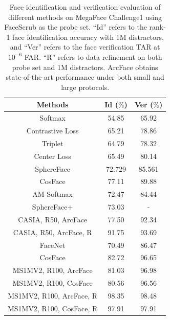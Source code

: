 \documentclass[10pt,twocolumn,letterpaper]{article}
\begin{document}
\begin{table}[t!]
\begin{center}
\begin{tabular}{c|c|c}
\hline
Methods  & Id ($\%$) & Ver ($\%$) \\
\hline
Softmax  \cite{liu2017sphereface}                      & 54.85 & 65.92 \\
Contrastive Loss\cite{liu2017sphereface,sun2014deep}   & 65.21 & 78.86\\
Triplet \cite{liu2017sphereface,schroff2015facenet}    & 64.79 & 78.32\\
Center Loss\cite{wen2016discriminative}                & 65.49 & 80.14 \\
SphereFace \cite{liu2017sphereface} & 72.729 & 85.561  \\
CosFace \cite{tencent2017CosineFace} & 77.11 & 89.88 \\
AM-Softmax \cite{wang2018additive}   & 72.47 & 84.44 \\
SphereFace+ \cite{liu2018learning}   & 73.03 & - \\
\hline
CASIA, R50, ArcFace                  & 77.50 & 92.34\\
CASIA, R50, ArcFace, R               & 91.75 & 93.69\\
\hline\hline
FaceNet \cite{schroff2015facenet}    & 70.49       & 86.47 \\
CosFace \cite{tencent2017CosineFace} & 82.72       & 96.65 \\
\hline
MS1MV2, R100, ArcFace               & 81.03       & 96.98 \\
MS1MV2, R100, CosFace               & 80.56       & 96.56  \\
MS1MV2, R100, ArcFace, R            & 98.35       & 98.48 \\
MS1MV2, R100, CosFace, R            & 97.91       & 97.91  \\
\hline
\end{tabular}
\end{center}
\vspace{-2mm}
\caption{Face identification and verification evaluation of different methods on MegaFace Challenge1 using FaceScrub as the probe set. ``Id'' refers to the rank-1 face identification accuracy with 1M distractors, and ``Ver'' refers to the face verification TAR at $10^{-6}$ FAR. ``R'' refers to data refinement on both probe set and 1M distractors. ArcFace obtains state-of-the-art performance under both small and large protocols.}
\label{table:megaface}
\vspace{-4mm}
\end{table}
\end{document}
